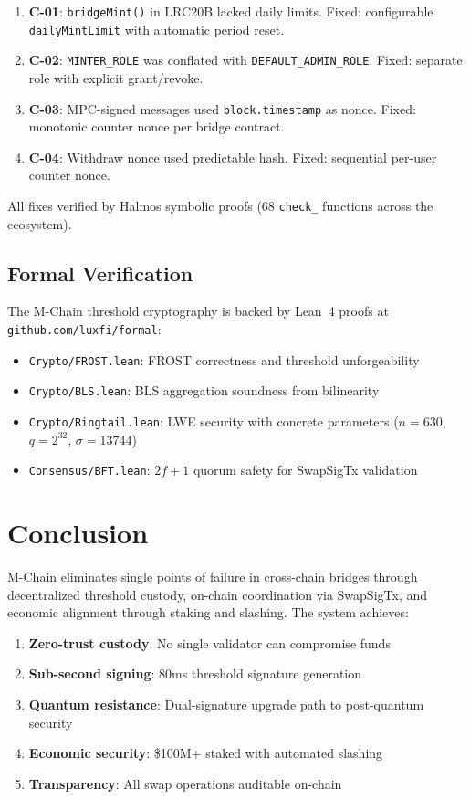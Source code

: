\documentclass[11pt]{article}
\begin{document}
\begin{enumerate}
\item \textbf{C-01}: \texttt{bridgeMint()} in LRC20B lacked daily limits. Fixed: configurable \texttt{dailyMintLimit} with automatic period reset.
\item \textbf{C-02}: \texttt{MINTER\_ROLE} was conflated with \texttt{DEFAULT\_ADMIN\_ROLE}. Fixed: separate role with explicit grant/revoke.
\item \textbf{C-03}: MPC-signed messages used \texttt{block.timestamp} as nonce. Fixed: monotonic counter nonce per bridge contract.
\item \textbf{C-04}: Withdraw nonce used predictable hash. Fixed: sequential per-user counter nonce.
\end{enumerate}

All fixes verified by Halmos symbolic proofs (68 \texttt{check\_} functions across the ecosystem).

\subsection{Formal Verification}

The M-Chain threshold cryptography is backed by Lean~4 proofs at \texttt{github.com/luxfi/formal}:
\begin{itemize}
\item \texttt{Crypto/FROST.lean}: FROST correctness and threshold unforgeability
\item \texttt{Crypto/BLS.lean}: BLS aggregation soundness from bilinearity
\item \texttt{Crypto/Ringtail.lean}: LWE security with concrete parameters ($n=630$, $q=2^{32}$, $\sigma=13744$)
\item \texttt{Consensus/BFT.lean}: $2f+1$ quorum safety for SwapSigTx validation
\end{itemize}

\section{Conclusion}

M-Chain eliminates single points of failure in cross-chain bridges through decentralized threshold custody, on-chain coordination via SwapSigTx, and economic alignment through staking and slashing. The system achieves:

\begin{enumerate}
\item \textbf{Zero-trust custody}: No single validator can compromise funds
\item \textbf{Sub-second signing}: 80ms threshold signature generation
\item \textbf{Quantum resistance}: Dual-signature upgrade path to post-quantum security
\item \textbf{Economic security}: \$100M+ staked with automated slashing
\item \textbf{Transparency}: All swap operations auditable on-chain
\end{enumerate}
\end{document}
